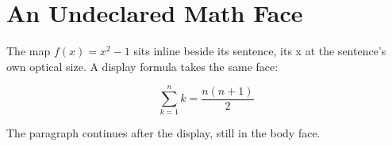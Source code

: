 \documentclass{article}
\begin{document}
\section{An Undeclared Math Face}

The map $f(x) = x^2 - 1$ sits inline beside its sentence, its x at the
sentence's own optical size. A display formula takes the same face:

\[ \sum_{k=1}^{n} k = \frac{n(n+1)}{2} \]

The paragraph continues after the display, still in the body face.
\end{document}
